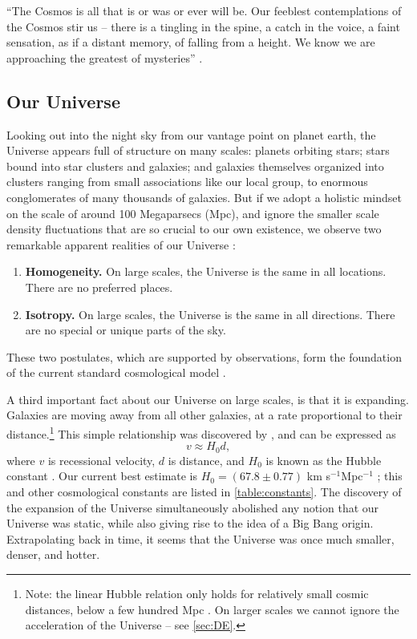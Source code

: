 ``The Cosmos is all that is or was or ever will be. Our feeblest contemplations of the Cosmos stir us -- there is a tingling in the spine, a catch in the voice, a faint sensation, as if a distant memory, of falling from a height. We know we are approaching the greatest of mysteries'' \citep{Sagan80}.


\subsection{Our Universe}

Looking out into the night sky from our vantage point on planet earth, the Universe appears full of structure on many scales: planets orbiting stars; stars bound into star clusters and galaxies; and galaxies themselves organized into clusters ranging from small associations like our local group, to enormous conglomerates of many thousands of galaxies. But if we adopt a holistic mindset on the scale of around 100 Megaparsecs (Mpc), and ignore the smaller scale density fluctuations that are so crucial to our own existence, we observe two remarkable apparent realities of our Universe \citep[e.g.][\textcolor{red}{and?}]{RydenText}:
\begin{enumerate}
\item {\bf Homogeneity.} On large scales, the Universe is the same in all locations. There are no preferred places.
\item {\bf Isotropy.} On large scales, the Universe is the same in all directions. There are no special or unique parts of the sky.
\end{enumerate}
These two postulates, which are supported by observations, form the foundation of the current standard cosmological model \textcolor{red}{\citep{BS01}}.

A third important fact about our Universe on large scales, is that it is expanding. Galaxies are moving away from all other galaxies, at a rate proportional to their distance.\footnote{Note: the linear Hubble relation only holds for relatively small cosmic distances, below a few hundred Mpc \citep{RydenText}. On larger scales we cannot ignore the acceleration of the Universe -- see \autoref{sec:DE}.} This simple relationship was discovered by \citet{Hubble29}, and can be expressed as
\begin{equation}
v \approx H_0 d,
\end{equation}
where $v$ is recessional velocity, $d$ is distance, and $H_0$ is known as the Hubble constant \citep{RydenText}. Our current best estimate is $H_0 = (67.8\pm0.77)$ km s$^{-1}$Mpc$^{-1}$ \citep{PlanckXVI}; this and other cosmological constants are listed in \autoref{table:constants}. The discovery of the expansion of the Universe simultaneously abolished any notion that our Universe was static, while also giving rise to the idea of a Big Bang origin. Extrapolating back in time, it seems that the Universe was once much smaller, denser, and hotter. 

